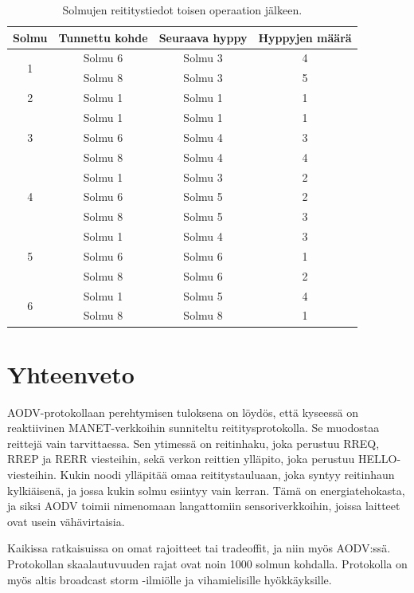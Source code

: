 \documentclass[finnish,utf8,nonumbib,palatino]{KokkolaRaportti}
\begin{document}
\begin{table}[htbp]
\centering
\begin{tabular}{cccc}
\toprule
\textbf{Solmu} & \textbf{Tunnettu kohde} & \textbf{Seuraava hyppy} & \textbf{Hyppyjen määrä} \\
\midrule
\multirow{2}{*}{1} & Solmu 6 & Solmu 3 & 4 \\
                   & Solmu 8 & Solmu 3 & 5 \\
\midrule
2 & Solmu 1 & Solmu 1 & 1 \\
\midrule
\multirow{3}{*}{3} & Solmu 1 & Solmu 1 & 1 \\
                   & Solmu 6 & Solmu 4 & 3 \\
                   & Solmu 8 & Solmu 4 & 4 \\
\midrule
\multirow{3}{*}{4} & Solmu 1 & Solmu 3 & 2 \\
                   & Solmu 6 & Solmu 5 & 2 \\
                   & Solmu 8 & Solmu 5 & 3 \\
\midrule
\multirow{3}{*}{5} & Solmu 1 & Solmu 4 & 3 \\
                   & Solmu 6 & Solmu 6 & 1 \\
                   & Solmu 8 & Solmu 6 & 2 \\
\midrule
\multirow{2}{*}{6} & Solmu 1 & Solmu 5 & 4 \\
                   & Solmu 8 & Solmu 8 & 1 \\
\bottomrule
\end{tabular}
\caption{Solmujen reititystiedot toisen operaation jälkeen.}
\label{tab:routing-table-2}
\end{table}


\chapter{Yhteenveto}

AODV-protokollaan perehtymisen tuloksena on löydös, että kyseessä on reaktiivinen MANET-verkkoihin sunniteltu reititysprotokolla. Se muodostaa reittejä vain tarvittaessa. Sen ytimessä on reitinhaku, joka perustuu RREQ, RREP ja RERR viesteihin, sekä verkon reittien ylläpito, joka perustuu HELLO-viesteihin. Kukin noodi ylläpitää omaa reititystauluaan, joka syntyy reitinhaun kylkiäisenä, ja jossa kukin solmu esiintyy vain kerran. Tämä on energiatehokasta, ja siksi AODV toimii nimenomaan langattomiin sensoriverkkoihin, joissa laitteet ovat usein vähävirtaisia.

Kaikissa ratkaisuissa on omat rajoitteet tai tradeoffit, ja niin myös AODV:ssä. Protokollan skaalautuvuuden rajat ovat noin 1000 solmun kohdalla. Protokolla on myös altis broadcast storm -ilmiölle ja vihamielisille hyökkäyksille.
\end{document}
